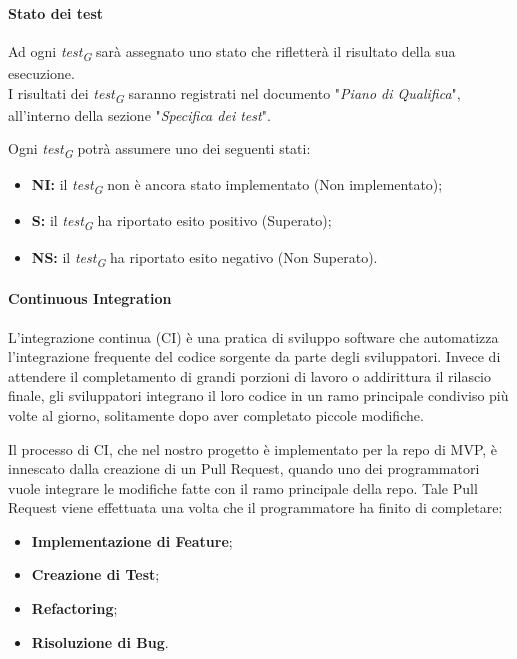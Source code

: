 \paragraph{Stato dei test}
Ad ogni \textit{test}\textsubscript{\textit{G}} sarà assegnato uno stato che rifletterà il risultato della sua esecuzione. \\
I risultati dei \textit{test}\textsubscript{\textit{G}} saranno registrati nel documento "\textit{Piano di Qualifica}", all'interno della sezione "\textit{Specifica dei test}".

\vspace{0.2cm}

Ogni \textit{test}\textsubscript{\textit{G}} potrà assumere uno dei seguenti stati:

\begin{itemize}
    \item \textbf{NI:} 
        il \textit{test}\textsubscript{\textit{G}} non è ancora stato implementato (Non implementato); 
    \item \textbf{S:} 
        il \textit{test}\textsubscript{\textit{G}} ha riportato esito positivo (Superato); 
    \item \textbf{NS:}
        il \textit{test}\textsubscript{\textit{G}} ha riportato esito negativo (Non Superato).
\end{itemize}

\paragraph{Continuous Integration}
L'integrazione continua (CI) è una pratica di sviluppo software che automatizza l'integrazione frequente del codice sorgente da parte degli sviluppatori. Invece di attendere il completamento di grandi porzioni di lavoro o addirittura il rilascio finale, gli sviluppatori integrano il loro codice in un ramo principale condiviso più volte al giorno, solitamente dopo aver completato piccole modifiche.

\vspace{0.2cm}

Il processo di CI, che nel nostro progetto è implementato per la repo di MVP, è innescato dalla creazione di un Pull Request, quando uno dei programmatori vuole integrare le modifiche fatte con il ramo principale della repo. Tale Pull Request viene effettuata una volta che il programmatore ha finito di completare:

\begin{itemize}
    \item \textbf{Implementazione di Feature};
    \item \textbf{Creazione di Test};
    \item \textbf{Refactoring};
    \item \textbf{Risoluzione di Bug}.
\end{itemize}

